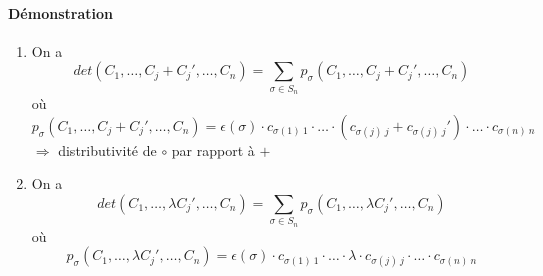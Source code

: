 \paragraph{Démonstration} 
\begin{enumerate}
  \item On a
    $$det(C_1, \ldots, C_j + C_j', \ldots, C_n) = \sum_{\sigma \in S_n} p_\sigma(C_1, \ldots, C_j + C_j' , \ldots, C_n)$$
    où
    $$ p_{\sigma}(C_1, \ldots, C_j + C_j', \ldots, C_n) = \epsilon(\sigma) \cdot c_{\sigma(1) ~ 1} \cdot \ldots \cdot (c_{\sigma(j) ~ j} + c_{\sigma(j) ~ j}') \cdot \ldots \cdot c_{\sigma(n) ~ n}$$
    $\Rightarrow$ distributivité de $\circ$ par rapport à $+$
   
  \item On a
    $$det(C_1, \ldots, \lambda C_j', \ldots, C_n) = \sum_{\sigma \in S_n} p_\sigma(C_1, \ldots, \lambda C_j' , \ldots, C_n)$$
    où
    $$ p_{\sigma}(C_1, \ldots, \lambda C_j', \ldots, C_n) = \epsilon(\sigma) \cdot c_{\sigma(1) ~ 1} \cdot \ldots \cdot \lambda \cdot c_{\sigma(j) ~ j}  \cdot \ldots \cdot c_{\sigma(n) ~ n}$$


\end{enumerate}

